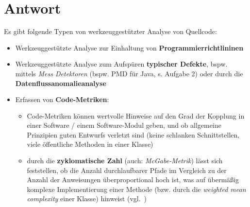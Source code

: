 
\section*{Antwort}

Es gibt folgende Typen von werkzeuggestützter Analyse von Quellcode:

\begin{itemize}
    \item Werkzeuggestützte Analyse zur Einhaltung von \textbf{Programmierrichtlininen}
    \item Werkzeuggestützte Analyse zum Aufspüren \textbf{typischer Defekte}, bspw. mittels \textit{Mess Detektoren} (bspw. PMD für Java, s. Aufgabe 2) oder durch die \textbf{Datenflussanomalieanalyse}
    \item Erfassen von \textbf{Code-Metriken}:
    \begin{itemize}
        \item Code-Metriken können wertvolle Hinweise auf den Grad der Kopplung in einer Software / einem Software-Modul geben, und ob allgemeine Prinzipien guten Entwurfs verletzt sind (keine schlanken Schnittstellen, viele öffentliche Methoden in einer Klasse)
        \item durch die \textbf{zyklomatische Zahl} (auch: \textit{McGabe-Metrik}) lässt sich feststellen, ob die Anzahl durchlaufbarer Pfade im Vergleich zu der Anzahl der Anweisungen überproportional hoch ist, was auf übermäßig komplexe Implementierung einer Methode (bzw. durch die \textit{weighted mean complexity} einer Klasse) hinweist (vgl.~\cite[Abb. 4.3, 37]{Wed09c})
    \end{itemize}
\end{itemize}